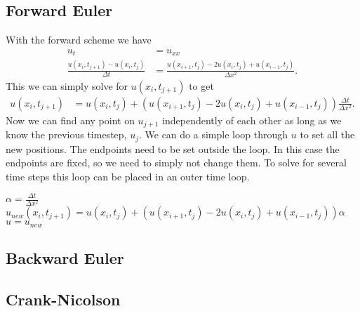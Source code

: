 \subsection{Forward Euler}

With the forward scheme we have
\begin{align*}
    u_t &= u_{xx} \\
    \frac{u(x_i, t_{j+1}) - u(x_i, t_j)}{\Delta t}
    &= \frac{u(x_{i+1}, t_j) - 2u(x_i, t_j) + u(x_{i-1}, t_j)}{\Delta x^2}.
\end{align*}
This we can simply solve for $u(x_i, t_{j+1})$ to get
\begin{align*}
    u(x_i, t_{j+1})
    &= u(x_i, t_j)
    +  \left( u(x_{i+1}, t_j) - 2u(x_i, t_j) + u(x_{i-1}, t_j) \right)
       \frac{\Delta t}{\Delta x^2}.
\end{align*}
Now we can find any point on $u_{j+1}$ independently of each other
as long as we know the previous timestep, $u_j$. We can do a simple
loop through $u$ to set all the new positions. The endpoints need
to be set outside the loop. In this case the endpoints are fixed,
so we need to simply not change them. To solve for several time
steps this loop can be placed in an outer time loop.
\begin{algorithmic}
    \State $ \alpha = \frac{\Delta t}{\Delta x^2} $
            \State $ u_{new}(x_i, t_{j+1})
            = u(x_i, t_j)
            + \left(
              u(x_{i+1}, t_j) - 2u(x_i, t_j) + u(x_{i-1}, t_j)
              \right) \alpha $
        \EndFor
        \State $ u = u_{new} $
    \EndFor
\end{algorithmic}


\subsection{Backward Euler}


\subsection{Crank-Nicolson}
